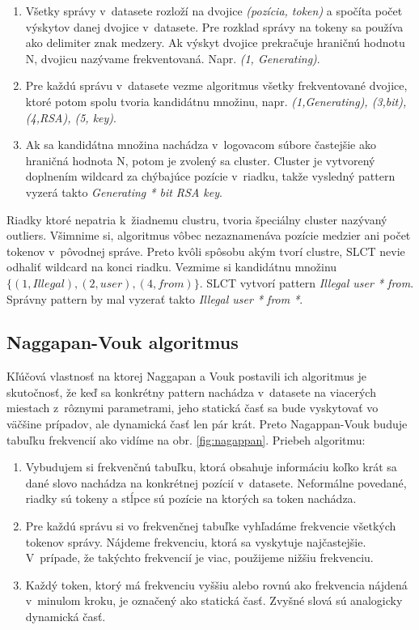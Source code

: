 \begin{enumerate}
  \item Všetky správy v~datasete rozloží na dvojice \emph{(pozícia, token)} a spočíta počet výskytov danej dvojice v~datasete. Pre rozklad správy na tokeny sa používa ako delimiter znak medzery. Ak výskyt dvojice prekračuje hraničnú hodnotu N, dvojicu nazývame frekventovaná. Napr. \emph{(1, Generating)}.
  \item Pre každú správu v~datasete vezme algoritmus všetky frekventované dvojice, ktoré potom spolu tvoria kandidátnu množinu, napr. \emph{{(1,Generating), (3,bit), (4,RSA), (5, key)}}. 
  \item Ak sa kandidátna množina nachádza v~logovacom súbore častejšie ako hraničná hodnota N, potom je zvolený sa cluster. Cluster je vytvorený doplnením wildcard za chýbajúce pozície v~riadku, takže vysledný pattern vyzerá takto \emph{Generating * bit RSA key}.
\end{enumerate}

Riadky ktoré nepatria k~žiadnemu clustru, tvoria špeciálny cluster nazývaný outliers. Všimnime si, algoritmus vôbec nezaznamenáva pozície medzier ani počet tokenov v~pôvodnej správe. Preto kvôli spôsobu akým tvorí clustre, SLCT nevie odhaliť wildcard na konci riadku. Vezmime si kandidátnu množinu $\{(1,Illegal), (2,user), (4,from)\} $. SLCT vytvorí pattern \emph{Illegal user * from}. Správny pattern by mal vyzerať takto  \emph{Illegal user * from *}.

\subsection{Naggapan-Vouk algoritmus}
Kľúčová vlastnosť na ktorej Naggapan a Vouk postavili ich algoritmus \parencite{nagappanvouk} je skutočnosť, že keď sa konkrétny pattern nachádza v~datasete na viacerých miestach z~rôznymi parametrami, jeho statická časť sa bude vyskytovať vo väčšine prípadov, ale dynamická časť len pár krát. Preto Nagappan-Vouk buduje tabuľku frekvencií ako vidíme na obr. \ref{fig:nagappan}. Priebeh algoritmu:

\begin{enumerate}
  \item Vybudujem si frekvenčnú tabuľku, ktorá obsahuje informáciu koľko krát sa dané slovo nachádza na konkrétnej pozícií v~datasete. Neformálne povedané, riadky sú tokeny a stĺpce sú pozície na ktorých sa token nachádza.
  \item Pre každú správu si vo frekvenčnej tabuľke vyhľadáme frekvencie všetkých tokenov správy. Nájdeme frekvenciu, ktorá sa vyskytuje najčastejšie. V~prípade, že takýchto frekvencií je viac, použijeme nižšiu frekvenciu.
  \item Každý token, ktorý má frekvenciu vyššiu alebo rovnú ako frekvencia nájdená v~minulom kroku, je označený ako statická časť. Zvyšné slová sú analogicky dynamická časť.
\end{enumerate}

